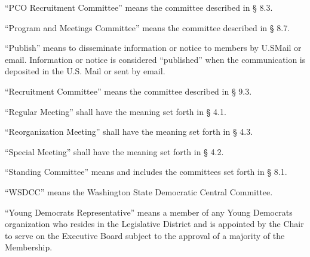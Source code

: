 \documentclass{article}
\begin{document}
\begin{alphalist}
    \item “PCO Recruitment Committee” means the committee described in § 8.3.
    \item “Program and Meetings Committee” means the committee described in § 8.7.
    \item “Publish” means to disseminate information or notice to members by U.SMail or email.  Information or notice is considered “published” when the communication is deposited in the U.S. Mail or sent by email.
    \item “Recruitment Committee” means the committee described in § 9.3.
    \item “Regular Meeting” shall have the meaning set forth in § 4.1.
    \item “Reorganization Meeting” shall have the meaning set forth in § 4.3.
    \item “Special Meeting” shall have the meaning set forth in § 4.2.
    \item “Standing Committee” means and includes the committees set forth in § 8.1.
    \item “WSDCC” means the Washington State Democratic Central Committee.
    \item “Young Democrats Representative” means a member of any Young Democrats organization who resides in the Legislative District and is appointed by the Chair to serve on the Executive Board subject to the approval of a majority of the Membership.
\end{alphalist}
\end{document}
